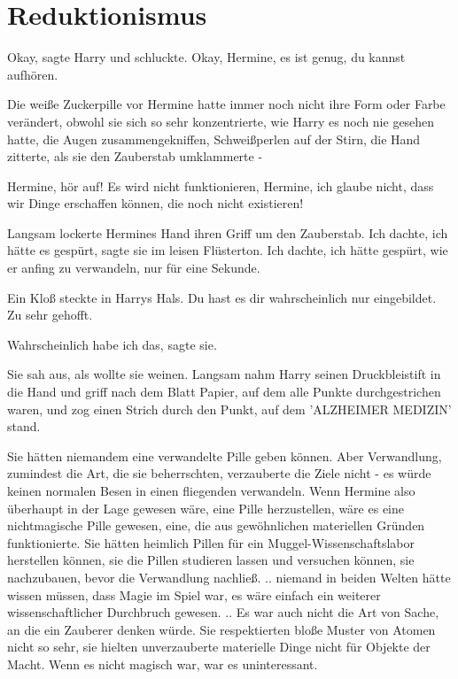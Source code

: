 \chapter{Reduktionismus}

\glqq{}Okay\grqq{}, sagte Harry und schluckte. \glqq{}Okay, Hermine, es ist genug,
du kannst aufhören.\grqq{}

Die weiße Zuckerpille vor Hermine hatte immer noch nicht ihre Form oder Farbe
verändert, obwohl sie sich so sehr konzentrierte, wie Harry es noch nie gesehen
hatte, die Augen zusammengekniffen, Schweißperlen auf der Stirn, die Hand
zitterte, als sie den Zauberstab umklammerte -

\glqq{}Hermine, hör auf! Es wird nicht funktionieren, Hermine, ich glaube nicht,
dass wir Dinge erschaffen können, die noch nicht existieren!\grqq{}

Langsam lockerte Hermines Hand ihren Griff um den Zauberstab. \glqq{}Ich dachte,
ich hätte es gespürt\grqq{}, sagte sie im leisen Flüsterton. \glqq{}Ich dachte,
ich hätte gespürt, wie er anfing zu verwandeln, nur für eine Sekunde.\grqq{}

Ein Kloß steckte in Harrys Hals. \glqq{}Du hast es dir wahrscheinlich nur
eingebildet. Zu sehr gehofft.\grqq{}

\glqq{}Wahrscheinlich habe ich das\grqq{}, sagte sie.

Sie sah aus, als wollte sie weinen. Langsam nahm Harry seinen Druckbleistift in
die Hand und griff nach dem Blatt Papier, auf dem alle Punkte durchgestrichen
waren, und zog einen Strich durch den Punkt, auf dem 'ALZHEIMER MEDIZIN' stand.

Sie hätten niemandem eine verwandelte Pille geben können. Aber Verwandlung,
zumindest die Art, die sie beherrschten, verzauberte die Ziele nicht - es würde
keinen normalen Besen in einen fliegenden verwandeln. Wenn Hermine also
überhaupt in der Lage gewesen wäre, eine Pille herzustellen, wäre es eine
nichtmagische Pille gewesen, eine, die aus gewöhnlichen materiellen Gründen
funktionierte. Sie hätten heimlich Pillen für ein Muggel-Wissenschaftslabor
herstellen können, sie die Pillen studieren lassen und versuchen können, sie
nachzubauen, bevor die Verwandlung nachließ. .. niemand in beiden Welten hätte
wissen müssen, dass Magie im Spiel war, es wäre einfach ein weiterer
wissenschaftlicher Durchbruch gewesen. .. Es war auch nicht die Art von Sache,
an die ein Zauberer denken würde. Sie respektierten bloße Muster von Atomen
nicht so sehr, sie hielten unverzauberte materielle Dinge nicht für Objekte der
Macht. Wenn es nicht magisch war, war es uninteressant.

